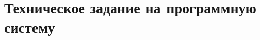 \documentclass[../nirs.tex]{subfiles}
\begin{document}
    \chapter{Техническое задание на программную систему}
    
    
    
    
    
\end{document}

